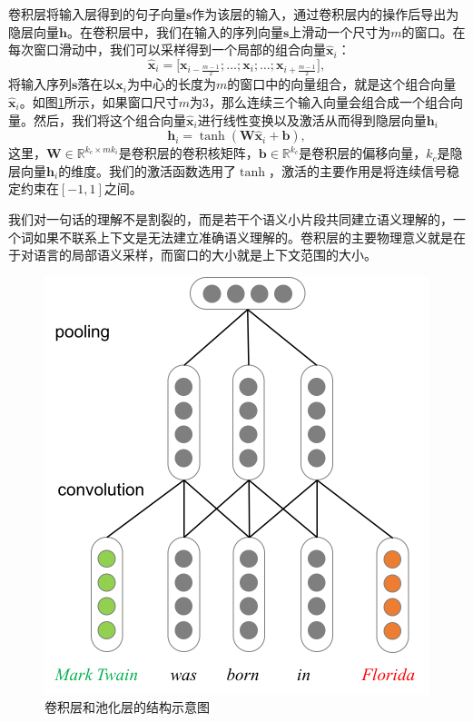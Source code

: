 卷积层将输入层得到的句子向量$\mathbf{s}$作为该层的输入，通过卷积层内的操作后导出为隐层向量$\mathbf{h}$。在卷积层中，我们在输入的序列向量$\mathbf{s}$上滑动一个尺寸为$m$的窗口。在每次窗口滑动中，我们可以采样得到一个局部的组合向量$\mathbf{\hat{x}}_i$：
\begin{equation}
\mathbf{\hat{x}}_i = \big[ \mathbf{x}_{i - \frac{m-1}{2}}; \ldots ; \mathbf{x}_i; \ldots ;\mathbf{x}_{i + \frac{m-1}{2}} \big],
\end{equation}
将输入序列$\mathbf{s}$落在以$\mathbf{x}_i$为中心的长度为$m$的窗口中的向量组合，就是这个组合向量$\mathbf{\hat{x}}_i$。如图\ref{fig3:conv_pooling}所示，如果窗口尺寸$m$为$3$，那么连续三个输入向量会组合成一个组合向量。然后，我们将这个组合向量$\mathbf{\hat{x}}_i$进行线性变换以及激活从而得到隐层向量$\mathbf{h}_i$
\begin{equation}
\mathbf{h}_i = \tanh(\mathbf{W}\mathbf{\hat{x}}_i + \mathbf{b}),
\end{equation}
这里，$\mathbf{W} \in \mathbb{R}^{k_c \times mk_i}$是卷积层的卷积核矩阵，$\mathbf{b} \in \mathbb{R}^{k_c}$是卷积层的偏移向量，$k_c$是隐层向量$\mathbf{h}_i$的维度。我们的激活函数选用了$\tanh$，激活的主要作用是将连续信号稳定约束在$[-1,1]$之间。

我们对一句话的理解不是割裂的，而是若干个语义小片段共同建立语义理解的，一个词如果不联系上下文是无法建立准确语义理解的。卷积层的主要物理意义就是在于对语言的局部语义采样，而窗口的大小就是上下文范围的大小。

\vspace{25pt}
\begin{figure}[h]
\setlength{\abovecaptionskip}{30pt} 
\centering
\includegraphics[width=0.7\columnwidth]{figures/ch3/cnn_concrete.png}
\caption{卷积层和池化层的结构示意图}
\label{fig3:conv_pooling}
\end{figure}




